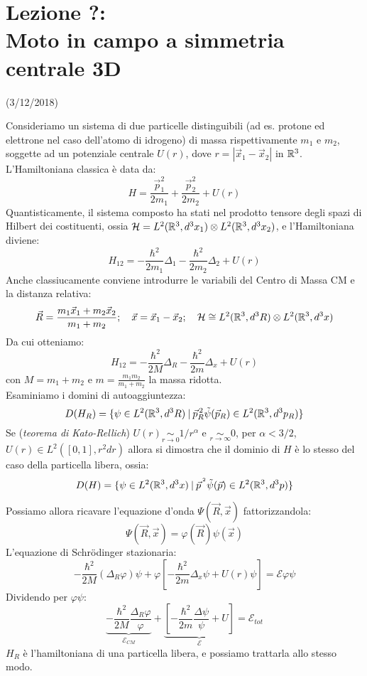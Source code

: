 \documentclass[../../FisicaTeorica.tex]{subfiles}
\begin{document}
\section{Lezione ?:\\ \large{Moto in campo a simmetria centrale 3D}}
\vspace{-1em}
\begin{center}
    \small{(3/12/2018)}
\end{center}

Consideriamo un sistema di due particelle distinguibili (ad es. protone ed elettrone nel caso dell'atomo di idrogeno) di massa rispettivamente $m_1$ e $m_2$, soggette ad un potenziale centrale $U(r)$, dove $r=|\vec{x}_1 - \vec{x}_2|$ in $\mathbb{R}^3$.\\
L'Hamiltoniana classica è data da:
\[
H=\frac{\vec{p}_1^2}{2m_1}+\frac{\vec{p}_2^2}{2m_2}+U(r)
\]
Quantisticamente, il sistema composto ha stati nel prodotto tensore degli spazi di Hilbert dei costituenti, ossia $\mathcal{H}=L^2(\mathbb{R}^3, d^3x_1)\otimes L^2(\mathbb{R}^3, d^3x_2)$, e l'Hamiltoniana diviene:
\[
H_{12} = -\frac{\hbar^2}{2m_1} \Delta_1 - \frac{\hbar^2}{2m_2} \Delta_2 + U(r)
\]
Anche classiucamente conviene introdurre le variabili del Centro di Massa CM e la distanza relativa:
\[
\vec{R}=\frac{m_1 \vec{x}_1 + m_2 \vec{x}_2}{m_1+m_2}; \quad \vec{x}=\vec{x}_1 -\vec{x}_2; \quad \mathcal{H} \cong L^2(\mathbb{R}^3, d^3R) \otimes L^2(\mathbb{R}^3, d^3x)
\]
Da cui otteniamo:
\[
H_{12}=-\frac{\hbar^2}{2M}\Delta_R - \frac{\hbar^2}{2m}\Delta_x + U(r)
\]
con $M=m_1+m_2$ e $m=\frac{m_1 m_2}{m_1+m_2}$ la massa ridotta.\\
Esaminiamo i domini di autoaggiuntezza:
\[
D(H_R)=\{\psi\in L^2(\mathbb{R}^3, d^3R) \>|\> \vec{p}_R^{\,2} \tilde{\psi}(\vec{p}_R) \in L^2(\mathbb{R}^3, d^3 p_R)\}
\]
Se (\textit{teorema di Kato-Rellich}) $U(r) \underset{r\to 0}{\sim} 1/r^\alpha$ e $\underset{r\to\infty}{\sim}0$, per $\alpha < 3/2$, $U(r) \in L^2([0,1], r^2 dr)$ allora si dimostra che il dominio di $H$ è lo stesso del caso della particella libera, ossia:
\[
D(H) = \{\psi \in L^2(\mathbb{R}^3, d^3 x)\>|\> \vec{p}^{\,^2} \tilde{\psi}(\vec{p}) \in L^2(\mathbb{R}^3, d^3 p)\}
\]

Possiamo allora ricavare l'equazione d'onda $\Psi(\vec{R},\vec{x})$ fattorizzandola:
\[
\Psi(\vec{R},\vec{x})=\varphi(\vec{R})\psi(\vec{x})
\]
L'equazione di Schr\"odinger stazionaria:
\[
-\frac{\hbar^2}{2M}(\Delta_R \varphi)\psi +\varphi[ -\frac{\hbar^2}{2m}\Delta_x \psi + U(r)\psi] = \mathcal{E}\varphi\psi
\]
Dividendo per $\varphi\psi$:
\[
\underbrace{-\frac{\hbar^2}{2M}\frac{\Delta_R \varphi}{\varphi}}_{\mathcal{E}_{CM}}+\underbrace{\left[
-\frac{\hbar^2}{2m} \frac{\Delta\psi}{\psi} + U
\right]}_{\mathcal{E}} = \mathcal{E}_{tot}
\]
$H_R$ è l'hamiltoniana di una particella libera, e possiamo trattarla allo stesso modo.\\
\end{document}
